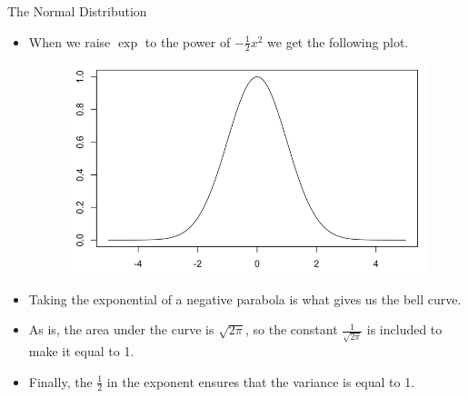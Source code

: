 \documentclass[handout]{beamer}
\begin{document}
\begin{frame}{The Normal Distribution}

\scriptsize{
\begin{itemize}
 \item When we raise $\exp$ to the power of $-\frac{1}{2}x^2$ we get the following plot.
 
   \begin{figure}[h!]
	\centering
	\includegraphics[scale=0.2]{pics/gauss_exp2.png}
\end{figure}
 
 \item Taking the exponential of a negative parabola is what gives us the bell curve. 
 \item As is, the area under the curve is $\sqrt{2\pi}$, so the constant $\frac{1}{\sqrt{2\pi}}$ is included to make it equal to 1.
 \item Finally, the $\frac{1}{2}$ in the exponent ensures that the variance is equal to 1. 
 \end{itemize}

}
\end{frame}
\end{document}
